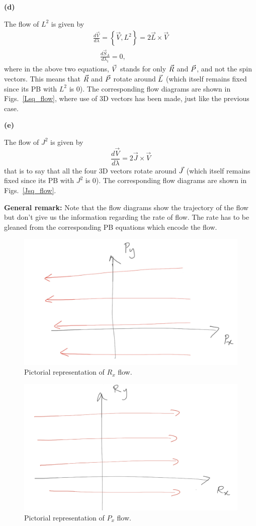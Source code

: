 \begin{Exercise}
\textbf{(d)}

The flow of $L^2$ is given by
\begin{align}
\frac{d \vec{V}}{d \lambda}=\left\{\vec{V}, L^{2}\right\}=2 \vec{L} \times \vec{V}  \\ 
\quad \frac{d \vec{S}_{A}}{d \lambda_{1}}=0,
\end{align}
where in the above two equations, $\vec{V}$ stands for only
$\vec{R}$ and $\vec{P}$, and not the spin vectors.
This means that $\vec{R}$ and $\vec{P}$
rotate around $\vec{L}$ (which itself remains fixed since its PB
with $L^2$ is 0).
The  corresponding flow diagrams are shown in
Figs.~\ref{Lsq_flow}, where use of 3D vectors has been made, just like the 
previous case.





\textbf{(e)}

The flow of $J^2$ is given by
\begin{equation}
\frac{d \vec{V}}{d \lambda}=2 \vec{J} \times \vec{V}
\end{equation}
that is to say that all the four 3D vectors
rotate around $\vec{J}$ (which itself remains fixed since its PB
with $J^2$ is 0).
The corresponding flow diagrams are shown in
Figs.~\ref{Jsq_flow}.


\textbf{General remark:} Note that the flow diagrams show the trajectory 
of the flow but don't give us the information regarding 
the rate of flow. The rate has to be gleaned from the 
corresponding PB equations which encode the flow.


\end{Exercise}





\begin{figure}
  \centering
  \includegraphics[width=0.4\linewidth]{Rx_flow}
  \caption{Pictorial representation of $R_x$ flow.
    \vspace{-1.em}
  }
  \label{Rx_flow}
\end{figure}



\begin{figure}
    \centering
  \includegraphics[width=0.4\linewidth]{Px_flow}
  \caption{Pictorial representation of $P_x$ flow.
    \vspace{-1.em}
  }
  \label{Px_flow}
\end{figure}



